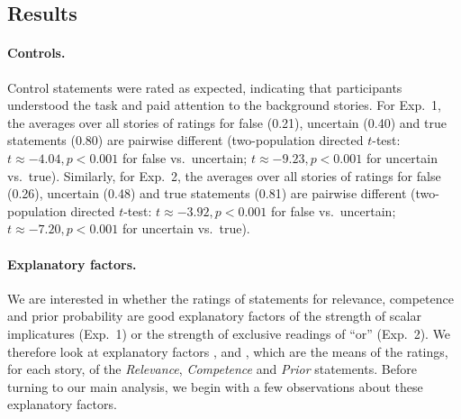 \documentclass[12pt]{article}
\begin{document}
\subsection*{Results}

\paragraph{Controls.} Control statements were rated as expected, indicating that participants
understood the task and paid attention to the background stories. For Exp.~1, the averages over
all stories of ratings for false (0.21), uncertain (0.40) and true statements (0.80) are
pairwise different (two-population directed $t$-test: $t \approx - 4.04, p < 0.001$ for false
vs.~uncertain; $t \approx - 9.23, p < 0.001$ for uncertain vs.~true). Similarly, for Exp.~2,
the averages over all stories of ratings for false (0.26), uncertain (0.48) and true statements
(0.81) are pairwise different (two-population directed $t$-test: $t \approx - 3.92, p < 0.001$
for false vs.~uncertain; $t \approx - 7.20, p < 0.001$ for uncertain vs.~true).

\paragraph{Explanatory factors.} We are interested in whether the ratings of statements for
relevance, competence and prior probability are good explanatory factors of the strength of
scalar implicatures (Exp.~1) or the strength of exclusive readings of ``or'' (Exp.~2). We
therefore look at explanatory factors \rel, \com and \pri, which are the means of the ratings,
for each story, of the \emph{Relevance}, \emph{Competence} and \emph{Prior} statements. Before
turning to our main analysis, we begin with a few observations about these explanatory factors.
\end{document}
